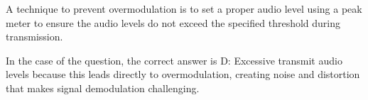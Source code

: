 A technique to prevent overmodulation is to set a proper audio level using a peak meter to ensure the audio levels do not exceed the specified threshold during transmission. 

In the case of the question, the correct answer is D: Excessive transmit audio levels because this leads directly to overmodulation, creating noise and distortion that makes signal demodulation challenging.

